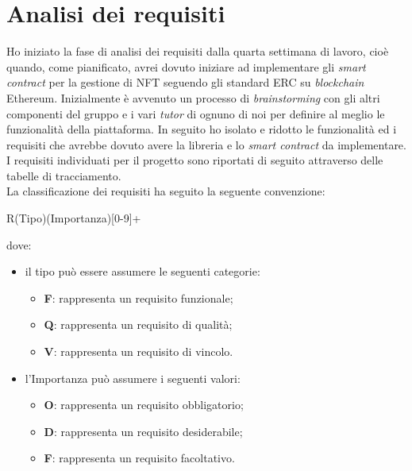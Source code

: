 
\section{Analisi dei requisiti}
Ho iniziato la fase di analisi dei requisiti dalla quarta settimana di lavoro, cioè quando, come pianificato, avrei dovuto iniziare ad implementare gli \textit{smart contract} per la gestione di NFT seguendo gli standard ERC su \textit{blockchain} Ethereum. Inizialmente è avvenuto un processo di \textit{brainstorming} con gli altri componenti del gruppo e i vari \textit{tutor} di ognuno di noi per definire al meglio le funzionalità della piattaforma. 
In seguito ho isolato e ridotto le funzionalità ed i requisiti che avrebbe dovuto avere la libreria e lo \textit{smart contract} da implementare. I requisiti individuati per il progetto sono riportati di seguito attraverso delle tabelle di tracciamento. \\

\noindent La classificazione dei requisiti ha seguito la seguente convenzione:
\begin{center}
  R(Tipo)(Importanza)[0-9]+
\end{center}
dove:
\begin{itemize}
  \item il tipo può essere assumere le seguenti categorie:
  \begin{itemize}
    \item \textbf{F}: rappresenta un requisito funzionale;
    \item \textbf{Q}: rappresenta un requisito di qualità;
    \item \textbf{V}: rappresenta un requisito di vincolo.
  \end{itemize}

  \item l'Importanza può assumere i seguenti valori:
  \begin{itemize}
    \item \textbf{O}: rappresenta un requisito obbligatorio;
    \item \textbf{D}: rappresenta un requisito desiderabile;
    \item \textbf{F}: rappresenta un requisito facoltativo.
  \end{itemize}
\end{itemize}
\clearpage
